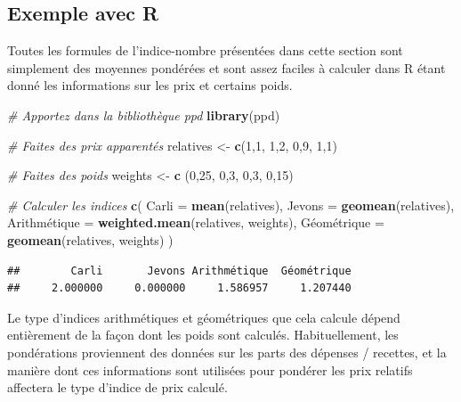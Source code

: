 \documentclass[]{article}
\newenvironment{Shaded}{\begin{snugshade}}{\end{snugshade}}
\newcommand{\CommentTok}[1]{\textcolor[rgb]{0.56,0.35,0.01}{\textit{#1}}}
\newcommand{\DataTypeTok}[1]{\textcolor[rgb]{0.13,0.29,0.53}{#1}}
\newcommand{\DecValTok}[1]{\textcolor[rgb]{0.00,0.00,0.81}{#1}}
\newcommand{\KeywordTok}[1]{\textcolor[rgb]{0.13,0.29,0.53}{\textbf{#1}}}
\newcommand{\NormalTok}[1]{#1}
\newcommand{\StringTok}[1]{\textcolor[rgb]{0.31,0.60,0.02}{#1}}
\begin{document}
\hypertarget{exemple-avec-r}{%
\subsection{Exemple avec R}\label{exemple-avec-r}}

Toutes les formules de l'indice-nombre présentées dans cette section sont simplement des moyennes pondérées et sont assez faciles à calculer dans R étant donné les informations sur les prix et certains poids.

\begin{Shaded}
\begin{Highlighting}[]
\CommentTok{# Apportez dans la bibliothèque ppd}
\KeywordTok{library}\NormalTok{(ppd)}

\CommentTok{# Faites des prix apparentés}
\NormalTok{relatives <-}\StringTok{ }\KeywordTok{c}\NormalTok{(}\DecValTok{1}\NormalTok{,}\DecValTok{1}\NormalTok{, }\DecValTok{1}\NormalTok{,}\DecValTok{2}\NormalTok{, }\DecValTok{0}\NormalTok{,}\DecValTok{9}\NormalTok{, }\DecValTok{1}\NormalTok{,}\DecValTok{1}\NormalTok{)}

\CommentTok{# Faites des poids}
\NormalTok{weights <-}\StringTok{ }\KeywordTok{c}\NormalTok{ (}\DecValTok{0}\NormalTok{,}\DecValTok{25}\NormalTok{, }\DecValTok{0}\NormalTok{,}\DecValTok{3}\NormalTok{, }\DecValTok{0}\NormalTok{,}\DecValTok{3}\NormalTok{, }\DecValTok{0}\NormalTok{,}\DecValTok{15}\NormalTok{)}

\CommentTok{# Calculer les indices}
\KeywordTok{c}\NormalTok{(}
  \DataTypeTok{Carli =} \KeywordTok{mean}\NormalTok{(relatives),}
  \DataTypeTok{Jevons =} \KeywordTok{geomean}\NormalTok{(relatives),}
\NormalTok{  Arithmé}\DataTypeTok{tique =} \KeywordTok{weighted.mean}\NormalTok{(relatives, weights),}
\NormalTok{  Géomé}\DataTypeTok{trique =} \KeywordTok{geomean}\NormalTok{(relatives, weights)}
\NormalTok{)}
\end{Highlighting}
\end{Shaded}

\begin{verbatim}
##        Carli       Jevons Arithmétique  Géométrique 
##     2.000000     0.000000     1.586957     1.207440
\end{verbatim}

Le type d'indices arithmétiques et géométriques que cela calcule dépend entièrement de la façon dont les poids sont calculés. Habituellement, les pondérations proviennent des données sur les parts des dépenses / recettes, et la manière dont ces informations sont utilisées pour pondérer les prix relatifs affectera le type d'indice de prix calculé.
\end{document}
